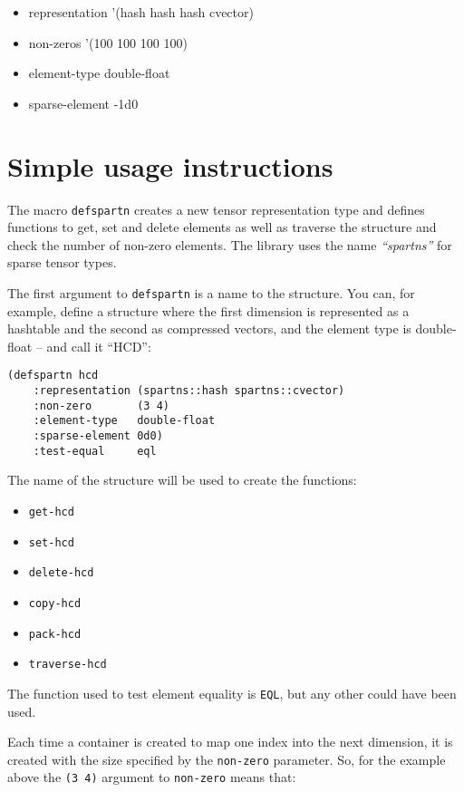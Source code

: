 \documentclass{article}
\begin{document}
\begin{itemize}
\item representation '(hash hash hash cvector)
\item non-zeros      '(100  100  100  100)
\item element-type   double-float
\item sparse-element -1d0
\end{itemize}


\section{Simple usage instructions}

The macro \verb+defspartn+ creates a new tensor representation type and
defines functions to get, set and delete elements as well as traverse the
structure and check the number of non-zero elements. The library uses the
name {\em ``spartns''} for sparse tensor types.

The first argument to \verb+defspartn+ is a name to the structure. You can, for example,
define a structure where the first dimension is represented as a hashtable and the second
as compressed vectors, and the element type is double-float -- and call it ``HCD'':

\begin{lstlisting}
(defspartn hcd
    :representation (spartns::hash spartns::cvector)
    :non-zero       (3 4)
    :element-type   double-float
    :sparse-element 0d0)
    :test-equal     eql
\end{lstlisting}

The name of the structure will be used to create the functions:

\begin{itemize}
\item \verb+get-hcd+
\item \verb+set-hcd+
\item \verb+delete-hcd+
\item \verb+copy-hcd+
\item \verb+pack-hcd+
\item \verb+traverse-hcd+
\end{itemize}

The function used to test element equality is \verb+EQL+, but any other could have been used.

Each time a container is created to map one index into the next dimension, it is created with
the size specified by the \verb+non-zero+ parameter. So, for the example above the \verb+(3 4)+
argument to \verb+non-zero+ means that:
\end{document}
